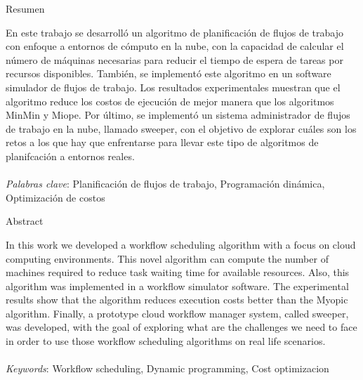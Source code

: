 \begin{center}
Resumen
\end{center}
\noindent En este trabajo se desarroll\'o un algoritmo de planificaci\'on de flujos de trabajo con enfoque a entornos de c\'omputo en la nube, con la capacidad de calcular el número de máquinas necesarias para reducir el tiempo de espera de tareas por recursos disponibles. Tambi\'en, se implement\'o este algoritmo en un software simulador de flujos de trabajo. Los resultados experimentales muestran que el algoritmo reduce los costos de ejecuci\'on de mejor manera que los algoritmos MinMin y Miope. Por \'ultimo, se implement\'o un sistema administrador de flujos de trabajo en la nube, llamado sweeper, con el objetivo de explorar cu\'ales son los retos a los que hay que enfrentarse para llevar este tipo de algoritmos de planifcaci\'on a entornos reales.
\\\\
\noindent \emph{Palabras clave}: Planificación de flujos de trabajo, Programaci\'on din\'amica, Optimizaci\'on de costos

\begin{center}
Abstract
\end{center}
\noindent In this work we developed a workflow scheduling algorithm with a focus on cloud computing environments. This novel algorithm can compute the number of machines required to reduce task waiting time for available resources. Also, this algorithm was implemented in a workflow simulator software. The experimental results show that the algorithm reduces execution costs better than the Myopic algorithm. Finally, a prototype cloud workflow manager system, called sweeper, was developed, with the goal of exploring what are the challenges we need to face in order to use those workflow scheduling algorithms on real life scenarios.
\\\\
\noindent \emph{Keywords}: Workflow scheduling, Dynamic programming, Cost optimizacion

\clearpage